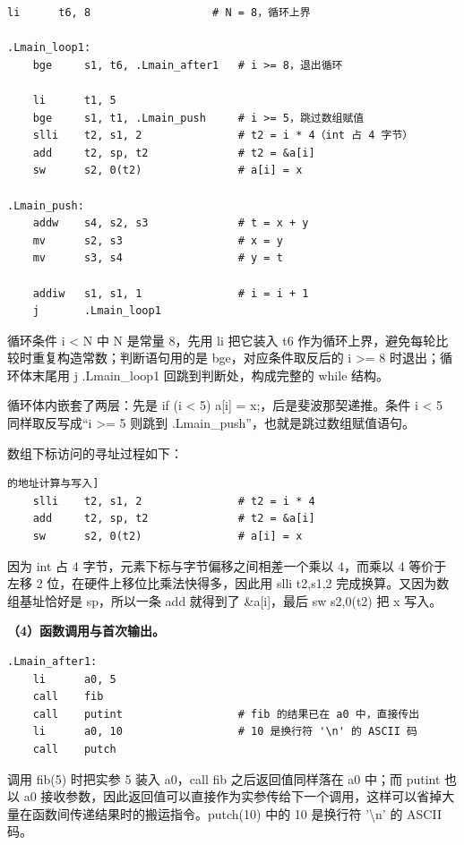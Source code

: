 \documentclass[UTF8,a4paper,10pt]{ctexart}
\begin{document}
\begin{lstlisting}[language=riscv]
    li      t6, 8                   # N = 8，循环上界

.Lmain_loop1:
    bge     s1, t6, .Lmain_after1   # i >= 8，退出循环

    li      t1, 5
    bge     s1, t1, .Lmain_push     # i >= 5，跳过数组赋值
    slli    t2, s1, 2               # t2 = i * 4（int 占 4 字节）
    add     t2, sp, t2              # t2 = &a[i]
    sw      s2, 0(t2)               # a[i] = x

.Lmain_push:
    addw    s4, s2, s3              # t = x + y
    mv      s2, s3                  # x = y
    mv      s3, s4                  # y = t

    addiw   s1, s1, 1               # i = i + 1
    j       .Lmain_loop1
\end{lstlisting}

循环条件 i < N 中 N 是常量 8，先用 li 把它装入 t6 作为循环上界，避免每轮比较时重复构造常数；判断语句用的是 bge，对应条件取反后的 i >= 8 时退出；循环体末尾用 j .Lmain\_loop1 回跳到判断处，构成完整的 while 结构。

循环体内嵌套了两层：先是 if (i < 5) a[i] = x;，后是斐波那契递推。条件 i < 5 同样取反写成“i >= 5 则跳到 .Lmain\_push”，也就是跳过数组赋值语句。

数组下标访问的寻址过程如下：

\begin{lstlisting}[language=riscv] 的地址计算与写入]
    slli    t2, s1, 2               # t2 = i * 4
    add     t2, sp, t2              # t2 = &a[i]
    sw      s2, 0(t2)               # a[i] = x
\end{lstlisting}

因为 int 占 4 字节，元素下标与字节偏移之间相差一个乘以 4，而乘以 4 等价于左移 2 位，在硬件上移位比乘法快得多，因此用 slli t2,s1,2 完成换算。又因为数组基址恰好是 sp，所以一条 add 就得到了 \&a[i]，最后 sw s2,0(t2) 把 x 写入。

\textbf{（4）函数调用与首次输出。}

\begin{lstlisting}[language=riscv]
.Lmain_after1:
    li      a0, 5
    call    fib
    call    putint                  # fib 的结果已在 a0 中，直接传出
    li      a0, 10                  # 10 是换行符 '\n' 的 ASCII 码
    call    putch
\end{lstlisting}

调用 fib(5) 时把实参 5 装入 a0，call fib 之后返回值同样落在 a0 中；而 putint 也以 a0 接收参数，因此返回值可以直接作为实参传给下一个调用，这样可以省掉大量在函数间传递结果时的搬运指令。putch(10) 中的 10 是换行符 '\textbackslash n' 的 ASCII 码。
\end{document}
